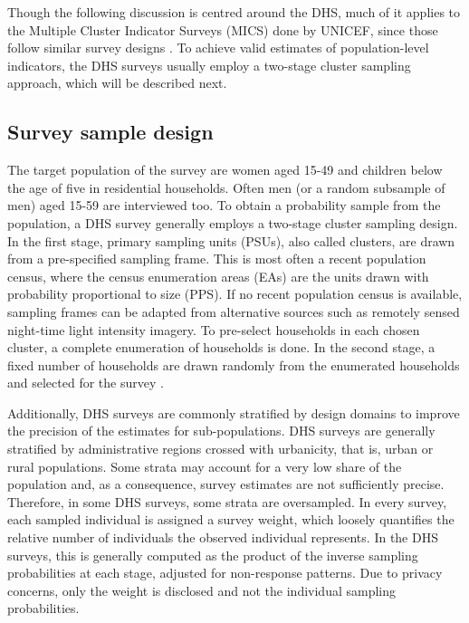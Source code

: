 Though the following discussion is centred around the DHS, much of it applies to the  Multiple Cluster Indicator Surveys (MICS) done by UNICEF, since those follow similar survey designs \autocite{khanMultipleIndicatorCluster2019}. To achieve valid estimates of population-level indicators, the DHS surveys usually employ a two-stage cluster sampling approach, which will be described next.


\subsection{Survey sample design}\label{sec:survey-design}

The target population of the survey are women aged 15-49 and children below the age of five in residential households. Often men (or a random subsample of men) aged 15-59 are interviewed too. To obtain a probability sample from the population, a DHS survey generally employs a two-stage cluster sampling design. In the first stage, primary sampling units (PSUs), also called clusters, are drawn from a pre-specified sampling frame. This is most often a recent population census, where the census enumeration areas (EAs) are the units drawn with probability proportional to size (PPS). If no recent population census is available, sampling frames can be adapted from alternative sources such as remotely sensed night-time light intensity imagery. To pre-select households in each chosen cluster, a complete enumeration of households is done. In the second stage, a fixed number of households are drawn randomly from the enumerated households and selected for the survey \autocite{icfinternationalDemographicHealthSurvey2012a}. 

Additionally, DHS surveys are commonly stratified by design domains to improve the precision of the estimates for sub-populations. DHS surveys are generally stratified by administrative regions crossed with urbanicity, that is, urban or rural populations. Some strata may account for a very low share of the population and, as a consequence, survey estimates are not sufficiently precise. Therefore, in some DHS surveys, some strata are oversampled. In every survey, each sampled individual is assigned a survey weight, which loosely quantifies the relative number of individuals the observed individual represents. In the DHS surveys, this is generally computed as the product of the inverse sampling probabilities at each stage, adjusted for non-response patterns. Due to privacy concerns, only the weight is disclosed and not the individual sampling probabilities. 


